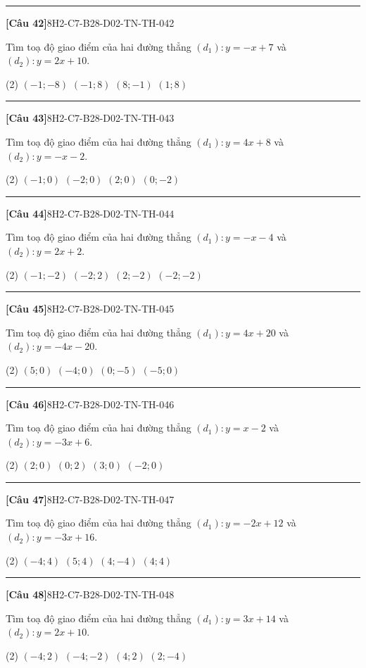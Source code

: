 \documentclass[12pt,a4paper]{article}
\newif\ifloigiai
\newenvironment{cauhoi}[2]{%
  \par\medskip\noindent\rule{\textwidth}{0.4pt}\par\nopagebreak
  \noindent\textbf{[#1]}\hfill{\scriptsize\ttfamily #2}\par\nopagebreak\smallskip}{\par}
\newcommand{\dapan}[1]{\ifloigiai\par\smallskip\noindent\textit{Đáp án:} \textbf{#1}\par\fi}
\begin{document}
\begin{cauhoi}{Câu 42}{8H2-C7-B28-D02-TN-TH-042}
Tìm toạ độ giao điểm của hai đường thẳng $(d_1): y=-x+7$ và $(d_2): y=2x+10$.
\begin{tasks}(2)
\task $(-1;-8)$
\task $(-1;8)$
\task $(8;-1)$
\task $(1;8)$
\end{tasks}
\dapan{B}
\end{cauhoi}
\begin{cauhoi}{Câu 43}{8H2-C7-B28-D02-TN-TH-043}
Tìm toạ độ giao điểm của hai đường thẳng $(d_1): y=4x+8$ và $(d_2): y=-x-2$.
\begin{tasks}(2)
\task $(-1;0)$
\task $(-2;0)$
\task $(2;0)$
\task $(0;-2)$
\end{tasks}
\dapan{B}
\end{cauhoi}
\begin{cauhoi}{Câu 44}{8H2-C7-B28-D02-TN-TH-044}
Tìm toạ độ giao điểm của hai đường thẳng $(d_1): y=-x-4$ và $(d_2): y=2x+2$.
\begin{tasks}(2)
\task $(-1;-2)$
\task $(-2;2)$
\task $(2;-2)$
\task $(-2;-2)$
\end{tasks}
\dapan{D}
\end{cauhoi}
\begin{cauhoi}{Câu 45}{8H2-C7-B28-D02-TN-TH-045}
Tìm toạ độ giao điểm của hai đường thẳng $(d_1): y=4x+20$ và $(d_2): y=-4x-20$.
\begin{tasks}(2)
\task $(5;0)$
\task $(-4;0)$
\task $(0;-5)$
\task $(-5;0)$
\end{tasks}
\dapan{D}
\end{cauhoi}
\begin{cauhoi}{Câu 46}{8H2-C7-B28-D02-TN-TH-046}
Tìm toạ độ giao điểm của hai đường thẳng $(d_1): y=x-2$ và $(d_2): y=-3x+6$.
\begin{tasks}(2)
\task $(2;0)$
\task $(0;2)$
\task $(3;0)$
\task $(-2;0)$
\end{tasks}
\dapan{A}
\end{cauhoi}
\begin{cauhoi}{Câu 47}{8H2-C7-B28-D02-TN-TH-047}
Tìm toạ độ giao điểm của hai đường thẳng $(d_1): y=-2x+12$ và $(d_2): y=-3x+16$.
\begin{tasks}(2)
\task $(-4;4)$
\task $(5;4)$
\task $(4;-4)$
\task $(4;4)$
\end{tasks}
\dapan{D}
\end{cauhoi}
\begin{cauhoi}{Câu 48}{8H2-C7-B28-D02-TN-TH-048}
Tìm toạ độ giao điểm của hai đường thẳng $(d_1): y=3x+14$ và $(d_2): y=2x+10$.
\begin{tasks}(2)
\task $(-4;2)$
\task $(-4;-2)$
\task $(4;2)$
\task $(2;-4)$
\end{tasks}
\dapan{A}
\end{cauhoi}
\end{document}
